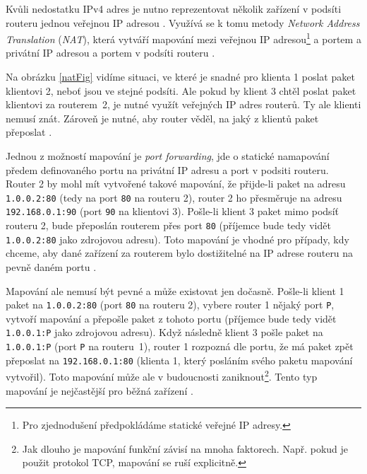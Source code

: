 Kvůli nedostatku IPv4 adres je nutno reprezentovat několik zařízení v podsíti
routeru jednou veřejnou IP adresou \parencite{Medium-NATWHyWeNeedIt}. Využívá se k
tomu metody \textit{Network Address Translation} (\textit{NAT}), která vytváří
mapování mezi veřejnou IP adresou\footnote{Pro zjednodušení předpokládáme
    statické veřejné IP adresy.} a portem a privátní IP adresou a portem v podsíti
routeru \parencite{WebRTCForTheCurious}.

Na obrázku \ref{natFig} vidíme situaci, ve které je snadné pro klienta 1 poslat
paket klientovi 2, neboť jsou ve stejné podsíti. Ale pokud by klient 3 chtěl
poslat paket klientovi za routerem~2, je nutné využít veřejných IP adres
routerů. Ty ale klienti nemusí znát. Zároveň je nutné, aby router věděl, na jaký
z klientů paket přeposlat \parencite{WebRTCForTheCurious}.

Jednou z možností mapování je \textit{port forwarding}, jde o statické
namapování předem definovaného portu na privátní IP adresu a port v podsiti
routeru. Router 2 by mohl mít vytvořené takové mapování, že přijde-li paket na
adresu \texttt{1.0.0.2:80} (tedy na port \texttt{80} na
routeru 2), router 2 ho přesměruje na adresu \texttt{192.168.0.1:90}
(port \texttt{90} na klientovi 3). Pošle-li klient 3 paket mimo podsíť
routeru 2, bude přeposlán routerem přes port \texttt{80} (příjemce
bude tedy vidět \texttt{1.0.0.2:80} jako zdrojovou adresu). Toto
mapování je vhodné pro případy, kdy chceme, aby dané zařízení za routerem bylo
dostižitelné na IP adrese routeru na pevně daném portu
\parencite{G2-WhatIsPortForwarding}.

Mapování ale nemusí být pevné a může existovat jen dočasně. Pošle-li klient 1
paket na \texttt{1.0.0.2:80} (port \texttt{80} na routeru
2), vybere router 1 nějaký port \texttt{P}, vytvoří mapování a
přepošle paket z tohoto portu (příjemce bude tedy vidět
\texttt{1.0.0.1:P} jako zdrojovou adresu). Když následně klient 3
pošle paket na \texttt{1.0.0.1:P} (port \texttt{P} na
routeru~1), router 1 rozpozná dle portu, že má paket zpět přeposlat na
\texttt{192.168.0.1:80} (klienta 1, který posláním svého paketu
mapování vytvořil). Toto mapování může ale v budoucnosti zaniknout\footnote{Jak
    dlouho je mapování funkční závisí na mnoha faktorech. Např. pokud je použit
    protokol TCP, mapování se ruší explicitně.}. Tento typ mapování je nejčastější
pro běžná zařízení \parencite{WebRTCForTheCurious}.

